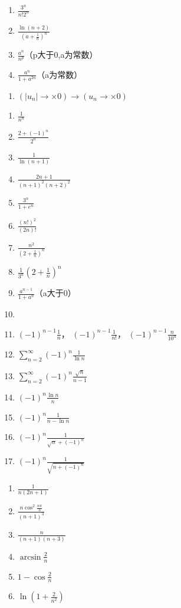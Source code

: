 \documentclass[UTF8,a4paper,12pt,scheme=chinese]{ctexart}
\begin{document}
\begin{Large}
\begin{enumerate}
			\item $\frac{3^n}{n!2^n}$
			\item $\frac{\ln(n+2)}{(a+\frac{1}{n})^n}$
			\item $\frac{a^n}{n^p}$（p大于0,a为常数）
			\item $\frac{a^n}{1+a^{2n}}$（a为常数）
		\end{enumerate}
		\begin{enumerate}
			\item $\left(|u_n| \rightarrow\times 0 \right)\rightarrow \left(u_n \rightarrow\times 0\right)$
		\end{enumerate}
		\begin{enumerate}
			\item $\frac{1}{n^n}$
			\item $\frac{2+(-1)^n}{2^n}$
			\item $\frac{1}{\ln(n+1)}$
			\item $\frac{2n+1}{(n+1)^2(n+2)^2}$
			\item $\frac{3^n}{1+e^n}$
			\item $\frac{(n!)^2}{(2n)!}$
			\item $\frac{n^2}{\left(2+\frac{1}{n}\right)^n}$
			\item $\frac{1}{3^n}\left(2+\frac{1}{n}\right)^n$
			\item $\frac{a^{n-1}}{1+a^n}$（a大于0）
			\item
			\item $(-1)^{n-1}\frac{1}{n}$，
			$(-1)^{n-1}\frac{1}{n!}$，
			$(-1)^{n-1}\frac{n}{10^n}$
			\item $\sum_{n=2}^{\infty}(-1)^n\frac{1}{\ln n}$
			\item $\sum_{n=2}^{\infty}(-1)^n\frac{\sqrt{n}}{n-1}$
			\item $(-1)^n\frac{\ln n}{n}$
			\item $(-1)^n\frac{1}{n-\ln n}$
			\item $(-1)^n\frac{1}{\sqrt{n}+(-1)^n}$
			\item $(-1)^n\frac{1}{\sqrt{n+(-1)^n}}$
		\end{enumerate}
		\begin{enumerate}
			\item $\frac{1}{n(2n+1)}$
			\item $\frac{n\cos^2\frac{n\pi}{3}}{(n+1)^3}$
			\item $\frac{n}{(n+1)(n+3)}$
			\item $\arcsin\frac{2}{n}$
			\item $1-\cos\frac{2}{n}$
			\item $\ln(1+\frac{2}{n^2})$

\end{enumerate}
\end{Large}
\end{document}
